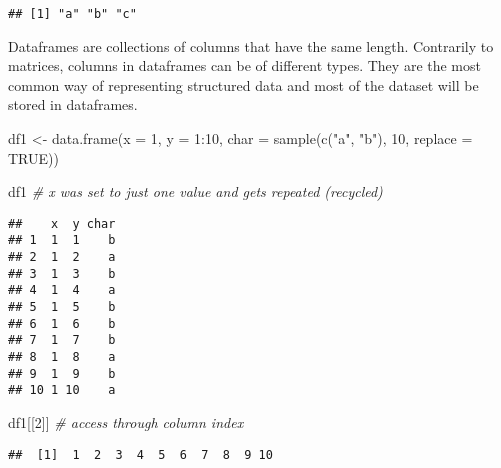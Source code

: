 \documentclass[
  oneside]{book}
\newenvironment{Shaded}{\begin{snugshade}}{\end{snugshade}}
\newcommand{\AttributeTok}[1]{\textcolor[rgb]{0.77,0.63,0.00}{#1}}
\newcommand{\CommentTok}[1]{\textcolor[rgb]{0.56,0.35,0.01}{\textit{#1}}}
\newcommand{\ConstantTok}[1]{\textcolor[rgb]{0.00,0.00,0.00}{#1}}
\newcommand{\DecValTok}[1]{\textcolor[rgb]{0.00,0.00,0.81}{#1}}
\newcommand{\FunctionTok}[1]{\textcolor[rgb]{0.00,0.00,0.00}{#1}}
\newcommand{\NormalTok}[1]{#1}
\newcommand{\OtherTok}[1]{\textcolor[rgb]{0.56,0.35,0.01}{#1}}
\newcommand{\SpecialCharTok}[1]{\textcolor[rgb]{0.00,0.00,0.00}{#1}}
\newcommand{\StringTok}[1]{\textcolor[rgb]{0.31,0.60,0.02}{#1}}
\begin{document}
\begin{Shaded}
\end{Shaded}

\begin{verbatim}
## [1] "a" "b" "c"
\end{verbatim}

Dataframes are collections of columns that have the same length.
Contrarily to matrices, columns in dataframes can be of different types.
They are the most common way of representing structured data and
most of the dataset will be stored in dataframes.

\begin{Shaded}
\begin{Highlighting}[]
\NormalTok{df1 }\OtherTok{\textless{}{-}} \FunctionTok{data.frame}\NormalTok{(}\AttributeTok{x =} \DecValTok{1}\NormalTok{, }\AttributeTok{y =} \DecValTok{1}\SpecialCharTok{:}\DecValTok{10}\NormalTok{,}
           \AttributeTok{char =} \FunctionTok{sample}\NormalTok{(}\FunctionTok{c}\NormalTok{(}\StringTok{"a"}\NormalTok{, }\StringTok{"b"}\NormalTok{), }\DecValTok{10}\NormalTok{, }\AttributeTok{replace =} \ConstantTok{TRUE}\NormalTok{))}

\NormalTok{df1 }\CommentTok{\# x was set to just one value and gets repeated (\textquotesingle{}recycled\textquotesingle{})}
\end{Highlighting}
\end{Shaded}

\begin{verbatim}
##    x  y char
## 1  1  1    b
## 2  1  2    a
## 3  1  3    b
## 4  1  4    a
## 5  1  5    b
## 6  1  6    b
## 7  1  7    b
## 8  1  8    a
## 9  1  9    b
## 10 1 10    a
\end{verbatim}

\begin{Shaded}
\begin{Highlighting}[]
\NormalTok{df1[[}\DecValTok{2}\NormalTok{]] }\CommentTok{\# access through column index}
\end{Highlighting}
\end{Shaded}

\begin{verbatim}
##  [1]  1  2  3  4  5  6  7  8  9 10
\end{verbatim}

\begin{Shaded}
\end{Shaded}
\end{document}
